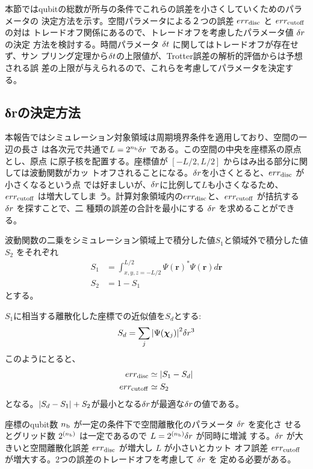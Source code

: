 \documentclass[fontsize=11pt]{jlreq}
\begin{document}
本節ではqubitの総数が所与の条件でこれらの誤差を小さくしていくためのパラメータの
決定方法を示す。空間パラメータによる２つの誤差 $err_{\mathrm{disc}}$ と $err_{\mathrm{cutoff}}$ の対は
トレードオフ関係にあるので、トレードオフを考慮したパラメータ値 $\delta r$ の決定
方法を検討する。時間パラメータ $\delta t$ に関してはトレードオフが存在せず、サン
プリング定理から$\delta t$の上限値が、Trotter誤差の解析的評価からは予想される誤
差の上限が与えられるので、これらを考慮してパラメータを決定する。

\subsection{δrの決定方法}
\label{subsec:delta-r-selection-method}
本報告ではシミュレーション対象領域は周期境界条件を適用しており、空間の一辺の長さ
は各次元で共通で$L=2^{n_{\mathrm{b}}}\delta r$ である。この空間の中央を座標系の原点とし、原点
に原子核を配置する。座標値が $[-L/2,L/2]$ からはみ出る部分に関しては波動関数がカッ
トオフされることになる。$\delta r$を小さくとると、$err_{\mathrm{disc}}$ が小さくなるという点
では好ましいが、$\delta r$に比例して$L$も小さくなるため、$err_{\mathrm{cutoff}}$ は増大してしま
う。計算対象領域内の$err_{\mathrm{disc}}$と、$err_{\mathrm{cutoff}}$ が拮抗する $\delta r$ を探すことで、二
種類の誤差の合計を最小にする $\delta r$ を求めることができる。

波動関数の二乗をシミュレーション領域上で積分した値$S_1$と領域外で積分した値$S_2$
をそれぞれ
\begin{align}
S_1 &= \int_{x,y,z=-L/2}^{L/2}\Psi(\bm{r})^{\ast}\Psi(\bm{r}) d\bm{r} \\
S_2 &= 1 - S_1
\end{align}
とする。

$S_1$に相当する離散化した座標での近似値を$S_d$とする:
\begin{equation}
S_d = \sum_{j}{\left| \Psi(\bm{\chi}_{j}) \right|}^2 \delta r^3
\end{equation}
このようにとると、
\begin{align}
err_{\mathrm{disc}} &\simeq {\left| S_1 - S_d \right|} \label{eq:err-disc-definition}\\
err_{\mathrm{cutoff}} &\simeq S_2 \label{eq:err-cutoff-definition}
\end{align}
となる。${\left| S_d-S_1 \right|}+S_2$が最小となる$\delta r$が最適な$\delta r$の値である。

座標のqubit数 $n_{\mathrm{b}}$ が一定の条件下で空間離散化のパラメータ $\delta r$ を変化さ
せるとグリッド数 $2^{(n_{\mathrm{b}})}$ は一定であるので $L=2^{(n_{\mathrm{b}})} \delta r$ が同時に増減
する。$\delta r$ が大きいと空間離散化誤差 $err_{\mathrm{disc}}$ が増大し $L$ が小さいとカット
オフ誤差 $err_{\mathrm{cutoff}}$ が増大する。2つの誤差のトレードオフを考慮して $\delta r$ を
定める必要がある。
\end{document}

